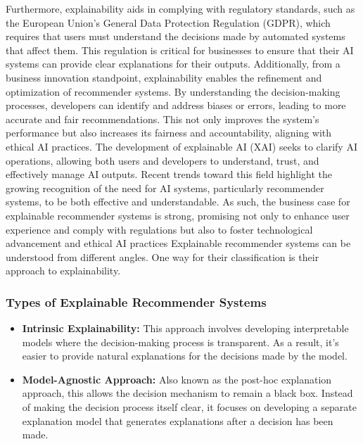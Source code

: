Furthermore, explainability aids in complying with regulatory standards, such as
the European Union's General Data Protection Regulation (GDPR), which requires that
users must understand the decisions made by automated systems that affect them.
This regulation is critical for businesses to ensure that their AI systems can
provide clear explanations for their outputs. Additionally, from a business
innovation standpoint, explainability enables the refinement and optimization of
recommender systems. By understanding the decision-making processes, developers can
identify and address biases or errors, leading to more accurate and fair
recommendations. This not only improves the system's performance but also increases
its fairness and accountability, aligning with ethical AI practices. The development
of explainable AI (XAI) seeks to clarify AI operations, allowing both users and
developers to understand, trust, and effectively manage AI outputs. Recent trends
toward this field highlight the growing recognition of the need for AI systems,
particularly recommender systems, to be both effective and understandable. As
such, the business case for explainable recommender systems is strong, promising
not only to enhance user experience and comply with regulations but also to
foster technological advancement and ethical AI practices \parencite{vultureanu-albisi_recommender_2021}
Explainable recommender systems can be understood from different angles. One way
for their classification is their approach to explainability.

\subsubsection{Types of Explainable Recommender Systems}

\begin{itemize}
	\item \textbf{Intrinsic Explainability:} This approach involves developing
		interpretable models where the decision-making process is transparent. As a result,
		it's easier to provide natural explanations for the decisions made by the
		model.

	\item \textbf{Model-Agnostic Approach:} Also known as the post-hoc explanation
		approach, this allows the decision mechanism to remain a black box. Instead
		of making the decision process itself clear, it focuses on developing a separate
		explanation model that generates explanations after a decision has been made.
\end{itemize}

